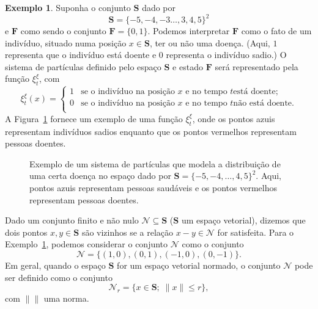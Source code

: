 \documentclass[twoside,openright,titlepage,numbers=noenddot,headinclude,  lineheaders footinclude=true,cleardoublepage=empty,
                                BCOR=5mm,paper=a4,fontsize=12pt ]{scrbook}
\theoremstyle{definition}
\newtheorem{exmp}{Exemplo}[section]
\begin{document}
\begin{exmp} \label{exemplo1}
Suponha o conjunto $\mathbf{S}$  dado por
\[
\mathbf{S} = \{-5,-4,-3 \ldots, 3, 4, 5\}^2
\]
e $\mathbf{F}$ como sendo o conjunto
$\mathbf{F}=\{0,1\}$. Podemos interpretar $\mathbf{F}$ como o fato de
um indivíduo, situado numa posição $x \in \mathbf{S}$,
ter ou não uma doença. (Aqui, $1$ representa que o indivíduo está
doente e $0$ representa o indivíduo sadio.)
O sistema de partículas definido pelo espaço $\mathbf{S}$ e 
estado $\mathbf{F}$ será representado pela função $\xi^{\xi}_t$,
com
\[
\xi^{\xi}_t(x) =
\begin{cases}
1 & \text{se o indivíduo na posição $x$ e no tempo $t$
          está doente};\\
0 & \text{se o indivíduo na posição $x$ e no tempo $t$
          não está doente}.\\
\end{cases}
\]
A Figura~\ref{fig:grafo0} fornece um exemplo de uma função
$\xi^{\xi}_t$, onde os pontos azuis representam indivíduos
sadios enquanto que os pontos vermelhos representam pessoas
doentes.
\begin{figure}[t!] 
\centering
{}
\caption{Exemplo de um sistema de partículas que modela a 
distribuição de uma certa doença no espaço dado por
$\mathbf{S} = \{-5,-4,\ldots,4,5\}^2$. Aqui, pontos azuis
representam pessoas saudáveis e os pontos vermelhos representam
pessoas doentes.}
\label{fig:grafo0}
\end{figure}

\end{exmp}

Dado um conjunto finito e não nulo $\mathscr{N} \subseteq
\mathbf{S}$ ($\mathbf{S}$ um espaço vetorial), dizemos 
que dois pontos $x, y \in \mathbf{S}$ são vizinhos se 
a relação
$x - y \in \mathscr{N}$ for satisfeita. 
Para o Exemplo~\ref{exemplo1}, podemos considerar o conjunto
$\mathscr{N}$ como o conjunto 
\[
\mathscr{N} = \{ (1,0), (0,1), (-1,0), (0,-1) \}.
\]
Em geral, quando o espaço $\mathbf{S}$ for um espaço vetorial
normado,
 o conjunto $\mathscr{N}$ pode ser definido como
o conjunto
\[
\mathscr{N}_r = \{ x \in \mathbf{S}; \; \|x\| \leq r \},
\]
com $\|\|$ uma norma.
\end{document}
